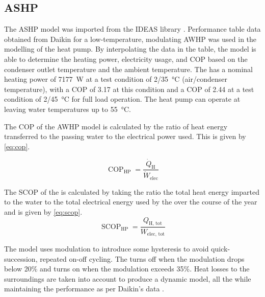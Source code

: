 \subsection{\acs{ASHP}} \label{subsec:ashp}
The \ac{ASHP} model was imported from the IDEAS library \cite{jorissen_implementation_2018}. Performance table data obtained from Daikin for a low-temperature, modulating \ac{AWHP} was used in the modelling of the heat pump. By interpolating the data in the table, the model is able to determine the heating power, electricity usage, and \ac{COP} based on the condenser outlet temperature and the ambient temperature. The \HP has a nominal heating power of \qty{7177}{\watt} at a test condition of \num{2}/\qty{35}{\celsius} (air/condenser temperature), with a \ac{COP} of 3.17 at this condition and a \ac{COP} of 2.44 at a test condition of \num{2}/\qty{45}{\celsius} for full load operation. The heat pump can operate at leaving water temperatures up to \qty{55}{\celsius}.

The \ac{COP} of the \ac{AWHP} model is calculated by the ratio of heat energy transferred to the passing water to the electrical power used. This is given by \cref{eq:cop}. 

\begin{equation}
    \operatorname{COP}_\text{HP}=\frac{\dot{Q}_\text{H}}{\dot{W}_\text{elec}}\label{eq:cop}
\end{equation}

The \ac{SCOP} of the \HP is calculated by taking the ratio the total heat energy imparted to the water to the total electrical energy used by the \HP over the course of the year and is given by \cref{eq:scop}.
\begin{equation}
    \operatorname{SCOP}_\text{HP}=\frac{Q_\text{H, tot}}{W_\text{elec, tot}}\label{eq:scop}
\end{equation}

The model uses modulation to introduce some hysteresis to avoid quick-succession, repeated on-off cycling. The \HP turns off when the modulation drops below 20\% and turns on when the modulation exceeds 35\%. Heat losses to the surroundings are taken into account to produce a dynamic model, all the while maintaining the performance as per Daikin's data \cite{daikin_altherma_tech_2006}.

